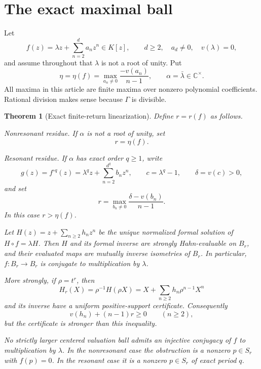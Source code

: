 \documentclass[11pt,letterpaper]{article}
\numberwithin{equation}{section}
\theoremstyle{plain}
\newtheorem{theorem}{Theorem}[section]
\theoremstyle{definition}
\theoremstyle{remark}
\newcommand{\C}{\mathbb C}
\begin{document}
\section{The exact maximal ball}\label{sec:exact}

Let
\begin{equation}\label{eq:f-main}
 f(z)=\lambda z+\sum_{n=2}^{d}a_nz^n\in K[z],\qquad d\ge2,
 \quad a_d\ne0,\quad v(\lambda)=0,
\end{equation}
and assume throughout that $\lambda$ is not a root of unity. Put
\begin{equation}\label{eq:eta}
 \eta=\eta(f)=\max_{a_n\ne0}\frac{-v(a_n)}{n-1},
 \qquad \alpha=\bar\lambda\in\C^\times.
\end{equation}
All maxima in this article are finite maxima over nonzero polynomial
coefficients. Rational division makes sense because $\Gamma$ is divisible.

\begin{theorem}[Exact finite-return linearization]\label{thm:exact}
Define $r=r(f)$ as follows.

\emph{Nonresonant residue.} If $\alpha$ is not a root of unity, set
\begin{equation}\label{eq:nonres-r}
 r=\eta(f).
\end{equation}

\emph{Resonant residue.} If $\alpha$ has exact order $q\ge1$, write
\begin{equation}\label{eq:g-main}
 g(z)=f^{\circ q}(z)=\lambda^qz+\sum_{n=2}^{d^q}b_nz^n,
 \qquad c=\lambda^q-1,\qquad \delta=v(c)>0,
\end{equation}
and set
\begin{equation}\label{eq:exact-r}
 \boxed{\displaystyle
 r=\max_{b_n\ne0}\frac{\delta-v(b_n)}{n-1}.}
\end{equation}
In this case $r>\eta(f)$.

Let $H(z)=z+\sum_{n\ge2}h_nz^n$ be the unique normalized formal solution
of $H\circ f=\lambda H$. Then $H$ and its formal inverse are strongly
Hahn-evaluable on $B_r$, and their evaluated maps are mutually inverse
isometries of $B_r$. In particular, $f:B_r\to B_r$ is conjugate to
multiplication by $\lambda$.

More strongly, if $\rho=t^r$, then
\begin{equation}\label{eq:H-scaled}
 H_r(X)=\rho^{-1}H(\rho X)
       =X+\sum_{n\ge2}h_n\rho^{n-1}X^n
\end{equation}
and its inverse have a uniform positive-support certificate. Consequently
\begin{equation}\label{eq:hn-bound}
 v(h_n)+(n-1)r\ge0\qquad(n\ge2),
\end{equation}
but the certificate is stronger than this inequality.

No strictly larger centered valuation ball admits an injective conjugacy of
$f$ to multiplication by $\lambda$. In the nonresonant case the obstruction
is a nonzero $p\in S_r$ with $f(p)=0$. In the resonant case it is a nonzero
$p\in S_r$ of exact period $q$.
\end{theorem}
\end{document}
